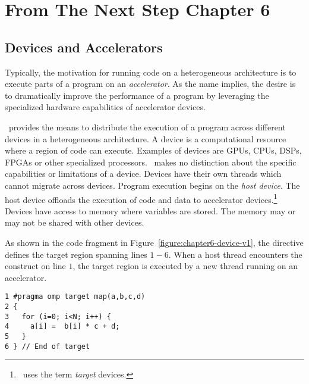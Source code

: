 \section{From The Next Step Chapter 6}
\subsection{Devices and Accelerators}
\label{sec:06.devices}

Typically, the motivation for running code on a heterogeneous architecture is
to execute parts of a program on an \emph{accelerator}.  As the name implies,
the desire is to dramatically improve the performance of a program by
leveraging the specialized hardware capabilities of accelerator devices.  

\OMP\ provides the means to distribute the execution of a program across
different devices in a heterogeneous architecture.  A device is a computational
resource where a region of code can execute.  Examples of devices are GPUs,
CPUs, DSPs, FPGAs or other specialized processors.  \OMP\ makes no distinction
about the specific capabilities or limitations of a device.  Devices have their
own threads which cannot migrate across devices.  Program execution begins on
the \emph{host device}.  The host device offloads the execution of code and
data to accelerator devices.\footnote{\OMP\ uses the term \emph{target}
devices.}  Devices have access to memory where variables are stored.  The
memory may or may not be shared with other devices.

As shown in the code fragment in Figure~\ref{figure:chapter6-device-v1}, the
 directive defines the target region spanning lines
$1-6$.   When a host thread encounters the  construct on line
$1$, the target region is executed by a new thread running on an accelerator. 

\begin{figure*}[!b]
\begin{verbatim}
1 #pragma omp target map(a,b,c,d)
2 {
3   for (i=0; i<N; i++) {
4     a[i] =  b[i] * c + d;
5   }
6 } // End of target
\end{verbatim}
\caption{ \textbf {Code fragment with one target region} -- \small
          The target region is executed by a thread running on
          an accelerator.
         }
\label{figure:chapter6-device-v1}
\end{figure*}

